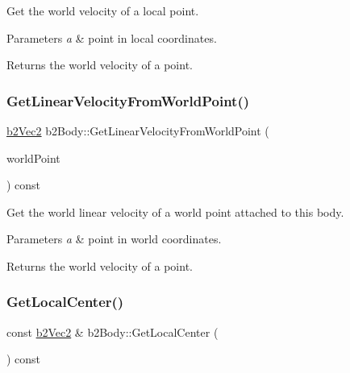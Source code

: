 Get the world velocity of a local point. 
\begin{DoxyParams}{Parameters}
{\em a} & point in local coordinates. \\
\hline
\end{DoxyParams}
\begin{DoxyReturn}{Returns}
the world velocity of a point. 
\end{DoxyReturn}
\mbox{\label{classb2_body_a5bc9a483e5f59199daa1751786034c1d}} 
\subsubsection{\texorpdfstring{GetLinearVelocityFromWorldPoint()}{GetLinearVelocityFromWorldPoint()}}
{\footnotesize\ttfamily \mbox{\hyperlink{structb2_vec2}{b2\+Vec2}} b2\+Body\+::\+Get\+Linear\+Velocity\+From\+World\+Point (\begin{DoxyParamCaption}\item[{const \mbox{\hyperlink{structb2_vec2}{b2\+Vec2}} \&}]{world\+Point }\end{DoxyParamCaption}) const\hspace{0.3cm}{\ttfamily [inline]}}

Get the world linear velocity of a world point attached to this body. 
\begin{DoxyParams}{Parameters}
{\em a} & point in world coordinates. \\
\hline
\end{DoxyParams}
\begin{DoxyReturn}{Returns}
the world velocity of a point. 
\end{DoxyReturn}
\mbox{\label{classb2_body_a60cc46fc46849b0d5e61a151b7c41269}} 
\subsubsection{\texorpdfstring{GetLocalCenter()}{GetLocalCenter()}}
{\footnotesize\ttfamily const \mbox{\hyperlink{structb2_vec2}{b2\+Vec2}} \& b2\+Body\+::\+Get\+Local\+Center (\begin{DoxyParamCaption}{ }\end{DoxyParamCaption}) const\hspace{0.3cm}{\ttfamily [inline]}}




